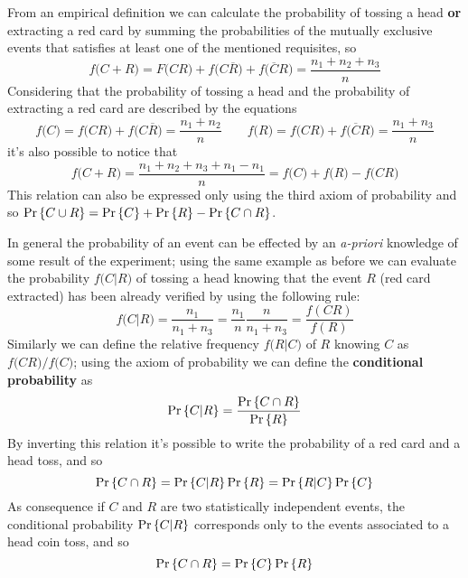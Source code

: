 	From an empirical definition we can calculate the probability of tossing a head \textbf{or} extracting a red card by summing the probabilities of the mutually exclusive events that satisfies at least one of the mentioned requisites, so
	\[ f\big(C+R\big) = F \big( CR\big) + f\big(C \overline R\big) + f\big(\overline C R\big) = \frac{n_1 + n_2 + n_3}{n}\]
	Considering that the probability of tossing a head and the probability of extracting a red card are described by the equations
	\[ f\big(C\big) = f\big(CR\big) + f\big(C\overline R\big) = \frac{n_1+n_2}{n} \qquad f\big(R\big) = f\big(CR\big) + f\big(\overline C R\big) = \frac{n_1+n_3}{n} \]
	it's also possible to notice that
	\[ f\big(C+R\big) = \frac{n_1+n_2+n_3 + n_1 - n_1}{n} = f\big(C\big) + f\big(R\big) - f\big(CR\big)\]
	This relation can also be expressed only using the third axiom of probability and so $\textrm{Pr}\left\{ C\cup R \right\} = \textrm{Pr}\left\{ C \right\} + \textrm{Pr}\left\{ R \right\} - \textrm{Pr}\left\{ C\cap R \right\}$.
	\vspace{3mm}
	
	In general the probability of an event can be effected by an \textit{a-priori} knowledge of some result of the experiment; using the same example as before we can evaluate the probability $f\big(C|R\big)$ of tossing a head knowing that the event $R$ (red card extracted) has been already verified by using the following rule:
	\[ f\big(C|R\big) = \frac{n_1}{n_1+n_3} = \frac{n_1}{n} \frac{n}{n_1+n_3} = \frac{f(CR)}{f(R)} \]
	Similarly we can define the relative frequency $f\big(R|C\big)$ of $R$ knowing $C$ as $f\big(CR\big)/f\big(C\big)$; using the axiom of probability we can define the \textbf{conditional probability} as
	\[ \textrm{Pr}\left\{ C|R \right\} = \frac{\textrm{Pr}\left\{ C\cap R \right\}}{\textrm{Pr}\left\{ R \right\}}\]
	By inverting this relation it's possible to write the probability of a red card and a head toss, and so
	\[ \textrm{Pr}\left\{ C \cap R \right\} = \textrm{Pr}\left\{ C|R \right\} \textrm{Pr}\left\{ R \right\} = \textrm{Pr}\left\{ R|C \right\} \textrm{Pr}\left\{ C \right\}\]
	As consequence if $C$ and $R$ are two statistically independent events, the conditional probability $\textrm{Pr}\left\{ C|R \right\}$ corresponds only to the events associated to a head coin toss, and so
	\[ \textrm{Pr}\left\{ C\cap R \right\} = \textrm{Pr}\left\{ C \right\} \textrm{Pr}\left\{ R \right\} \]
	
